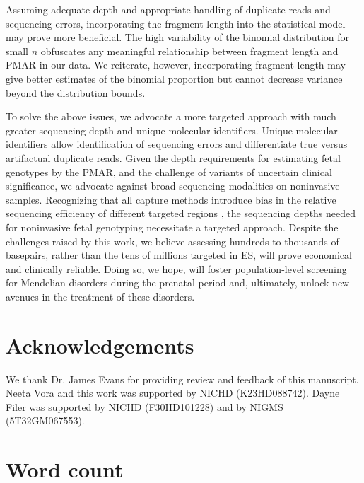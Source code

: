 \documentclass{article}\usepackage[]{graphicx}\usepackage[]{color}
\newcommand\wordcount{}
\begin{document}
Assuming adequate depth and appropriate handling of duplicate reads and sequencing errors, incorporating the fragment length into the statistical model may prove more beneficial.
The high variability of the binomial distribution for small $n$ obfuscates any meaningful relationship between fragment length and PMAR in our data.
We reiterate, however, incorporating fragment length may give better estimates of the binomial proportion but cannot decrease variance beyond the distribution bounds.

To solve the above issues, we advocate a more targeted approach with much greater sequencing depth and unique molecular identifiers.
Unique molecular identifiers allow identification of sequencing errors and differentiate true versus artifactual duplicate reads.
Given the depth requirements for estimating fetal genotypes by the PMAR, and the challenge of variants of uncertain clinical significance, we advocate against broad sequencing modalities on noninvasive samples.
Recognizing that all capture methods introduce bias in the relative sequencing efficiency of different targeted regions \cite{seaby:2016aa}, the sequencing depths needed for noninvasive fetal genotyping necessitate a targeted approach.
Despite the challenges raised by this work, we believe assessing hundreds to thousands of basepairs, rather than the tens of millions targeted in ES, will prove economical and clinically reliable.
Doing so, we hope, will foster population-level screening for Mendelian disorders during the prenatal period and, ultimately, unlock new avenues in the treatment of these disorders.

\nolinenumbers

\section*{Acknowledgements}
We thank Dr. James Evans for providing review and feedback of this manuscript.
Neeta Vora and this work was supported by NICHD (K23HD088742).
Dayne Filer was supported by NICHD (F30HD101228) and by NIGMS (5T32GM067553).




\newpage
\section*{Word count}
\wordcount
\end{document}
